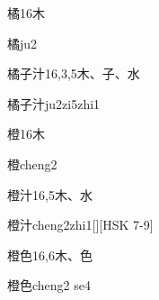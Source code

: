 \begin{Entry}{橘}{16}{⽊}
  \begin{Phonetics}{橘}{ju2}
  \end{Phonetics}
\end{Entry}

\begin{Entry}{橘子汁}{16,3,5}{⽊、⼦、⽔}
  \begin{Phonetics}{橘子汁}{ju2zi5zhi1}
  \end{Phonetics}
\end{Entry}

\begin{Entry}{橙}{16}{⽊}
  \begin{Phonetics}{橙}{cheng2}
  \end{Phonetics}
\end{Entry}

\begin{Entry}{橙汁}{16,5}{⽊、⽔}
  \begin{Phonetics}{橙汁}{cheng2zhi1}[][HSK 7-9]
  \end{Phonetics}
\end{Entry}

\begin{Entry}{橙色}{16,6}{⽊、⾊}
  \begin{Phonetics}{橙色}{cheng2 se4}
  \end{Phonetics}
\end{Entry}


